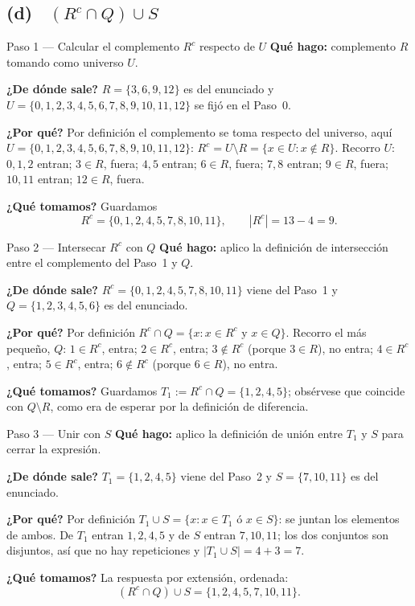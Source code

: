 \documentclass[11pt]{article}
\begin{document}
\subsection*{(d) \ $(R^{c}\cap Q)\cup S$}

\begin{paso}{Paso 1 --- Calcular el complemento $R^{c}$ respecto de $U$}
\textbf{Qué hago:} complemento $R$ tomando como universo $U$.

\textbf{¿De dónde sale?} $R=\{3,6,9,12\}$ es del enunciado y
$U=\{0,1,2,3,4,5,6,7,8,9,10,11,12\}$ se fijó en el Paso~0.

\textbf{¿Por qué?} Por definición el complemento se toma respecto del universo, aquí
$U=\{0,1,2,3,4,5,6,7,8,9,10,11,12\}$: $R^{c}=U\setminus R=\{x\in U: x\notin R\}$. Recorro
$U$: $0,1,2$ entran; $3\in R$, fuera; $4,5$ entran; $6\in R$, fuera; $7,8$ entran; $9\in R$,
fuera; $10,11$ entran; $12\in R$, fuera.

\textbf{¿Qué tomamos?} Guardamos
\[
R^{c}=\{0,1,2,4,5,7,8,10,11\},\qquad |R^{c}|=13-4=9 .
\]
\end{paso}

\begin{paso}{Paso 2 --- Intersecar $R^{c}$ con $Q$}
\textbf{Qué hago:} aplico la definición de intersección entre el complemento del Paso~1 y $Q$.

\textbf{¿De dónde sale?} $R^{c}=\{0,1,2,4,5,7,8,10,11\}$ viene del Paso~1 y
$Q=\{1,2,3,4,5,6\}$ es del enunciado.

\textbf{¿Por qué?} Por definición $R^{c}\cap Q=\{x: x\in R^{c} \text{ y } x\in Q\}$. Recorro
el más pequeño, $Q$: $1\in R^{c}$, entra; $2\in R^{c}$, entra; $3\notin R^{c}$ (porque
$3\in R$), no entra; $4\in R^{c}$, entra; $5\in R^{c}$, entra; $6\notin R^{c}$ (porque
$6\in R$), no entra.

\textbf{¿Qué tomamos?} Guardamos $T_1:=R^{c}\cap Q=\{1,2,4,5\}$; obsérvese que coincide con
$Q\setminus R$, como era de esperar por la definición de diferencia.
\end{paso}

\begin{paso}{Paso 3 --- Unir con $S$}
\textbf{Qué hago:} aplico la definición de unión entre $T_1$ y $S$ para cerrar la expresión.

\textbf{¿De dónde sale?} $T_1=\{1,2,4,5\}$ viene del Paso~2 y $S=\{7,10,11\}$ es del
enunciado.

\textbf{¿Por qué?} Por definición $T_1\cup S=\{x: x\in T_1 \text{ ó } x\in S\}$: se juntan los
elementos de ambos. De $T_1$ entran $1,2,4,5$ y de $S$ entran $7,10,11$; los dos conjuntos son
disjuntos, así que no hay repeticiones y $|T_1\cup S|=4+3=7$.

\textbf{¿Qué tomamos?} La respuesta por extensión, ordenada:
\[
(R^{c}\cap Q)\cup S=\{1,2,4,5,7,10,11\}.
\]
\end{paso}
\end{document}
